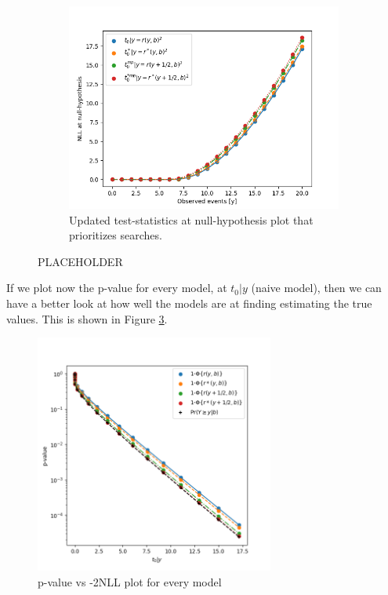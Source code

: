 \documentclass[14pt, a4paper]{article}  %
\begin{document}
\begin{figure}[!ht]
\begin{subfigure}[b]{0.49\textwidth}
        \includegraphics[width=1\textwidth]{Poisson_approximation_b6p7/NLL_null.png}\caption{Updated test-statistics at null-hypothesis plot that prioritizes searches. }\label{fig:example_nll0_fr}
     \end{subfigure}
	\caption{PLACEHOLDER}
 \end{figure}
 If we plot now the p-value for every model, at $t_0|y$ (naive model), then we can have a better look at how well the models are at finding estimating the true values. This is shown in Figure \ref{fig:example_p0}.
\begin{figure}[!ht]
	\centering
        \includegraphics[width=0.7\textwidth]{Poisson_approximation_b6p7/p_values_vs_nom_2NLL.png}\caption{p-value vs -2NLL plot for every model}\label{fig:example_p0}
\end{figure} 
\end{document}
